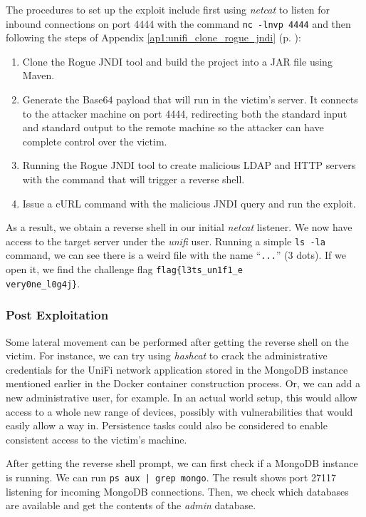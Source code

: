 The procedures to set up the exploit include first using \textit{netcat} to listen for inbound connections on port 4444 with the command \texttt{nc -lnvp 4444} and then following the steps of Appendix \ref{ap1:unifi_clone_rogue_jndi} (p. \pageref{ap1:unifi_clone_rogue_jndi}):

\begin{enumerate}
    \item Clone the Rogue JNDI tool and build the project into a JAR file using Maven.
    \item Generate the Base64 payload that will run in the victim's server. It connects to the attacker machine on port 4444, redirecting both the standard input and standard output to the remote machine so the attacker can have complete control over the victim.
    \item Running the Rogue JNDI tool to create malicious LDAP and HTTP servers with the command that will trigger a reverse shell.
    \item Issue a cURL command with the malicious JNDI query and run the exploit.
\end{enumerate}

As a result, we obtain a reverse shell in our initial \textit{netcat} listener. We now have access to the target server under the \textit{unifi} user. Running a simple \texttt{ls -la} command, we can see there is a weird file with the name ``\texttt{...}'' (3 dots). If we open it, we find the challenge flag \texttt{flag\{l3ts\_un1f1\_e\\very0ne\_l0g4j\}}.

\subsubsection{Post Exploitation} \label{sec:validation_log4j_post_exploitation}

Some lateral movement can be performed after getting the reverse shell on the victim. For instance, we can try using \textit{hashcat} to crack the administrative credentials for the UniFi network application stored in the MongoDB instance mentioned earlier in the Docker container construction process. Or, we can add a new administrative user, for example. In an actual world setup, this would allow access to a whole new range of devices, possibly with vulnerabilities that would easily allow a way in. Persistence tasks could also be considered to enable consistent access to the victim's machine.

After getting the reverse shell prompt, we can first check if a MongoDB instance is running. We can run \texttt{ps aux | grep mongo}. The result shows port 27117 listening for incoming MongoDB connections. Then, we check which databases are available and get the contents of the \textit{admin} database.

